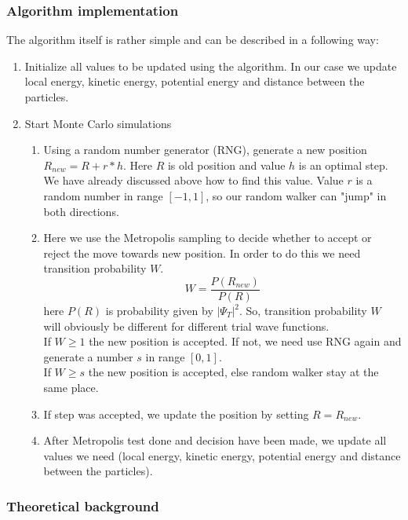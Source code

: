 \documentclass[10pt]{article}
\begin{document}
\subsubsection{Algorithm implementation}
The algorithm itself is rather simple and can be described in a following way:
 \begin{enumerate}
\item Initialize all values to be updated using the algorithm. In our case we update local energy, kinetic energy, potential energy and distance between the particles.
\item Start Monte Carlo simulations
  \begin{enumerate}
  \item Using a random number generator (RNG), generate a new position $R_{new} = R + r*h$. Here $R$ is old position and value $h$ is an optimal step. We have already discussed above how to find this value. Value $r$ is a random number in range $[-1,1]$, so our random walker can "jump" in both directions. 
  \item Here we use the Metropolis sampling to decide whether to accept or reject the move towards new position. In order to do this we need transition probability $W$. 
  \begin{equation}
  W=\frac{P(R_{new})}{P(R)}
  \end{equation}
  here $P(R)$ is probability given by $|\Psi_T|^2$. So, transition probability $W$ will obviously be different for different trial wave functions.\\
  If $W \geq 1$ the new position is accepted. If not, we need use RNG again and generate a number $s$ in range $[0,1]$. \\
  If $W \geq s$ the new position is accepted, else random walker stay at the same place.
    \item If step was accepted, we update the position by setting $R=R_{new}$.
    \item After Metropolis test done and decision have been made, we update all values we need (local energy, kinetic energy, potential energy and distance between the particles).
\end{enumerate}
\end{enumerate}

\subsubsection{Theoretical background}
\end{document}
